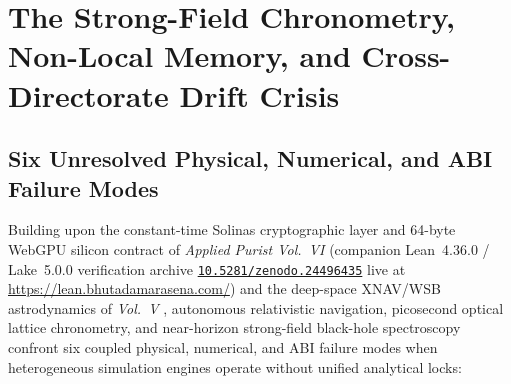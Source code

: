 \documentclass[11pt,a4paper,reqno]{article}
\theoremstyle{plain}
\theoremstyle{definition}
\theoremstyle{remark}
\numberwithin{equation}{section}
\numberwithin{table}{section}
\providecommand{\zenodo}[1]{\href{https://doi.org/10.5281/zenodo.#1}{\nolinkurl{10.5281/zenodo.#1}}}
\begin{document}
\clearpage
\tableofcontents
\clearpage

\section{The Strong-Field Chronometry, Non-Local Memory, and Cross-Directorate Drift Crisis}
\label{sec:intro}

\subsection{Six Unresolved Physical, Numerical, and ABI Failure Modes}
Building upon the constant-time Solinas cryptographic layer and 64-byte WebGPU silicon contract of \emph{Applied Purist Vol.~VI} \cite{AppliedPuristVol6Solinas2026,AppliedPuristVol6Lean2026} (companion Lean~4.36.0 / Lake~5.0.0 verification archive \zenodo{24496435} live at \url{https://lean.bhutadamarasena.com/}) and the deep-space XNAV/WSB astrodynamics of \emph{Vol.~V} \cite{AppliedPuristVol5Xnav2026}, autonomous relativistic navigation, picosecond optical lattice chronometry, and near-horizon strong-field black-hole spectroscopy confront six coupled physical, numerical, and ABI failure modes when heterogeneous simulation engines operate without unified analytical locks:
\end{document}
